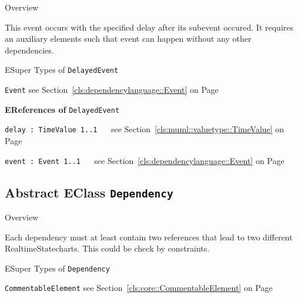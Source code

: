 	\begin{longdescription}
		\item[Overview] 		
				

	

		This event occurs with the specified delay after its subevent occured.
It requires an auxiliary elements such that event can happen without any other dependencies.		
		\item[ESuper Types of \texttt{DelayedEvent}] ~
			\begin{longdescription}
				\item[\texttt{Event}] see Section~\ref{cls:dependencylanguage::Event} on Page~\pageref{cls:dependencylanguage::Event}						\end{longdescription}
		
	
			\item[\textbf{EReferences of} \texttt{DelayedEvent}] ~
			\begin{longdescription}
	\item[\texttt{delay : TimeValue \symbol{"5B}1..1\symbol{"5D}
}] ~
	see Section~\ref{cls:muml::valuetype::TimeValue} on Page~\pageref{cls:muml::valuetype::TimeValue}
	
	\nopagebreak
		
				

	

	
	\item[\texttt{event : Event \symbol{"5B}1..1\symbol{"5D}
}] ~
	see Section~\ref{cls:dependencylanguage::Event} on Page~\pageref{cls:dependencylanguage::Event}
	
	\nopagebreak
		
				

	

	
			\end{longdescription}
	
	\end{longdescription}
	

\subsection{Abstract EClass \bfseries \texttt{Dependency}\normalfont}
\label{cls:dependencylanguage::Dependency} 
	
	\begin{longdescription}
		\item[Overview] 		
				

	

		Each dependency must at least contain two references that lead to two different RealtimeStatecharts.
This could be check by constraints.		
		\item[ESuper Types of \texttt{Dependency}] ~
			\begin{longdescription}
				\item[\texttt{CommentableElement}] see Section~\ref{cls:core::CommentableElement} on Page~\pageref{cls:core::CommentableElement}						\end{longdescription}
		
	
	
	\end{longdescription}
	

